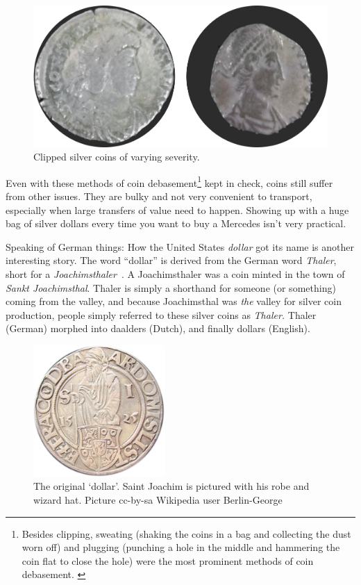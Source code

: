 \begin{figure}
  \includegraphics{assets/images/clipped-coins.png}
  \caption{Clipped silver coins of varying severity.}
  \label{fig:clipped-coins}
\end{figure}

Even with these methods of coin debasement\footnote{Besides clipping, sweating
(shaking the coins in a bag and collecting the dust worn off) and plugging
(punching a hole in the middle and hammering the coin flat to close the hole)
were the most prominent methods of coin debasement. \cite{wiki:coin-debasement}}
kept in check, coins still suffer from other issues. They are bulky and not very
convenient to transport, especially when large transfers of value need to
happen. Showing up with a huge bag of silver dollars every time you want to buy
a Mercedes isn't very practical.

Speaking of German things: How the United States \textit{dollar} got its name is
another interesting story. The word \enquote{dollar} is derived from the German word
\textit{Thaler}, short for a \textit{Joachimsthaler}~\cite{wiki:thaler}. A
Joachimsthaler was a coin minted in the town of \textit{Sankt Joachimsthal}.
Thaler is simply a shorthand for someone (or something) coming from the valley,
and because Joachimsthal was \textit{the} valley for silver coin production,
people simply referred to these silver coins as \textit{Thaler.} Thaler (German)
morphed into daalders (Dutch), and finally dollars (English).

\begin{figure}
  \centering
  \includegraphics[width=5cm]{assets/images/joachimsthaler.png}
  \caption{The original `dollar'. Saint Joachim is pictured with his robe and wizard hat. Picture cc-by-sa Wikipedia user Berlin-George}
  \label{fig:joachimsthaler}
\end{figure}

